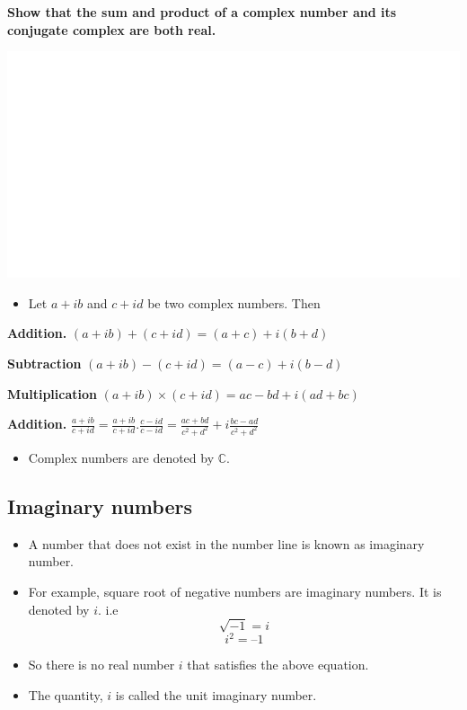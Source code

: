 \documentclass[]{book}
\providecommand{\tightlist}{%
  \setlength{\itemsep}{0pt}\setlength{\parskip}{0pt}}
\begin{document}
\textbf{Show that the sum and product of a complex number and its conjugate complex are both real.}

\begin{center}\includegraphics[width=1\linewidth]{figure/NSbox1a-1} \end{center}

\begin{itemize}
\tightlist
\item
  Let \(a+ib\) and \(c+id\) be two complex numbers. Then
\end{itemize}

\textbf{Addition.} \((a+ib) + (c+id)= (a+c)+i(b+d)\)

\textbf{Subtraction} \((a+ib) - (c+id)= (a-c)+i(b-d)\)

\textbf{Multiplication} \((a+ib) \times (c+id)= ac-bd+i(ad+bc)\)

\textbf{Addition.} \(\frac{a+ib}{c+id}= \frac{a+ib}{c+id}.\frac{c-id}{c-id}= \frac{ac+bd}{c^2+d^2}+i\frac{bc-ad}{c^2+d^2}\)

\begin{itemize}
\tightlist
\item
  Complex numbers are denoted by \(\mathbb{C}\).
\end{itemize}

\hypertarget{imaginary-numbers}{%
\subsection{Imaginary numbers}\label{imaginary-numbers}}

\begin{itemize}
\tightlist
\item
  A number that does not exist in the number line is known as imaginary number.
\item
  For example, square root of negative numbers are imaginary numbers. It is denoted by \(i\).
  i.e \[\sqrt{-1}=i\] \newline
  \[i^{2} = – 1\]
\item
  So there is no real number \(i\) that satisfies the above equation.
\item
  The quantity, \(i\) is called the unit imaginary number.
\end{itemize}
\end{document}
